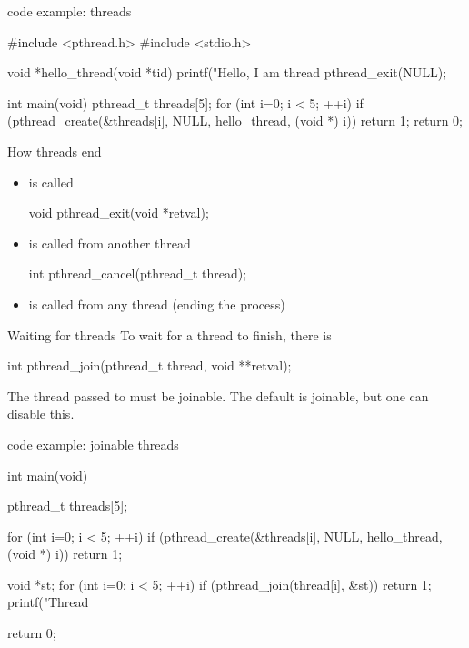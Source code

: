 \documentclass[10pt,graphics,aspectratio=169,table]{beamer}
\begin{document}
\begin{frame}[fragile]{code example: threads}
    \begin{codeblock}
#include <pthread.h>
#include <stdio.h>

void *hello_thread(void *tid) {
    printf("Hello, I am thread %
    pthread_exit(NULL);
}

int main(void) {
    pthread_t threads[5];
    for (int i=0; i < 5; ++i) {
       if (pthread_create(&threads[i], NULL,
                          hello_thread, (void *) i))
          return 1;
    }
    return 0;
}

\end{codeblock}
\end{frame}
\begin{frame}[fragile]{How threads end}
    \begin{itemize}
        \item {} is called
        \begin{codeblock}
void pthread_exit(void *retval);
\end{codeblock}
        \item {} is called from another thread
        \begin{codeblock}
int pthread_cancel(pthread_t thread);
\end{codeblock}
        \item {} is called from any thread (ending the process)
    \end{itemize}
\end{frame}
\begin{frame}[fragile]{Waiting for threads}
    To wait for a thread to finish, there is 
    \begin{codeblock}
int pthread_join(pthread_t thread, void **retval);
\end{codeblock}
    \bigskip
    The thread passed to  must be joinable. The default is joinable,
    but one can disable this.
\end{frame}

\begin{frame}[fragile]{code example: joinable threads}
    \begin{codeblock}
int main(void) {
    pthread_t threads[5];
    
    for (int i=0; i < 5; ++i) {
       if (pthread_create(&threads[i], NULL,
                          hello_thread, (void *) i))
          return 1;
    }

    void *st;
    for (int i=0; i < 5; ++i) {
       if (pthread_join(thread[i], &st))
           return 1;
       printf("Thread %
    }
    
    return 0;
}
\end{codeblock}
\end{frame}
\end{document}
